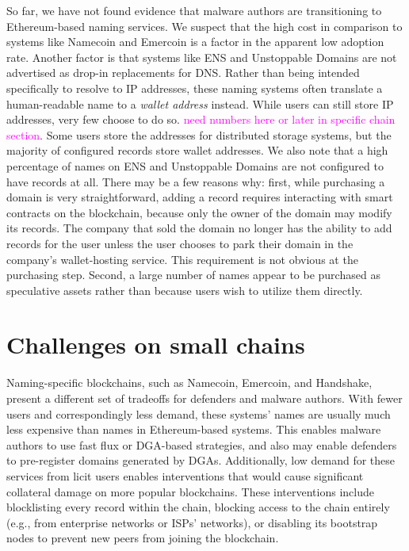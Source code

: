 \documentclass[10pt,sigconf,letterpaper]{acmart}
\newcommand{\randall}{\ding{110}\ding{43}\textcolor{magenta}}
\newcommand{\randall}{}
\begin{document}
So far, we have not found evidence that malware authors are 
transitioning to Ethereum-based naming services. We suspect that the high 
cost in 
comparison to systems like Namecoin and Emercoin is a factor in the apparent 
low adoption rate. 
Another factor is that systems like ENS and Unstoppable Domains are not 
advertised as drop-in 
replacements for DNS. Rather than being intended specifically to resolve to IP 
addresses, these 
naming systems often translate a human-readable name to a \emph{wallet 
address} instead. While 
users can still store IP addresses, very few choose to do so. 
\randall{need numbers here or later 
in specific chain section}. Some users store the addresses for distributed 
storage systems, but the 
majority of configured records store wallet addresses. We also note that a 
high percentage of names 
on ENS and Unstoppable Domains are not configured to have records at all. 
There may be a few 
reasons why: first, while purchasing a domain is very straightforward, 
adding a record requires 
interacting with smart contracts on the blockchain, because only the owner 
of the domain may modify 
its records. The company that sold the domain no longer has the ability to 
add records for the user 
unless the user chooses to park their domain in the company's wallet-hosting 
service. This 
requirement is not obvious at the purchasing step. Second, a large number of 
names appear to be 
purchased as speculative assets rather than because users wish to utilize them 
directly. 

\section{Challenges on small chains}

Naming-specific blockchains, such as Namecoin, Emercoin, and Handshake, 
present 
a different set of tradeoffs for defenders and malware authors. With fewer 
users and correspondingly less demand, these systems' names are usually 
much 
less expensive than names in Ethereum-based systems. This enables malware 
authors to use fast flux or DGA-based strategies, and also may enable 
defenders 
to pre-register domains generated by DGAs. Additionally, low demand for 
these 
services from licit users enables interventions that would cause significant 
collateral damage on more popular blockchains. These interventions include 
blocklisting every record within the chain, blocking access to the chain 
entirely (e.g., from enterprise networks or ISPs' networks), or disabling 
its 
bootstrap nodes to prevent new peers from joining the blockchain.
\end{document}
